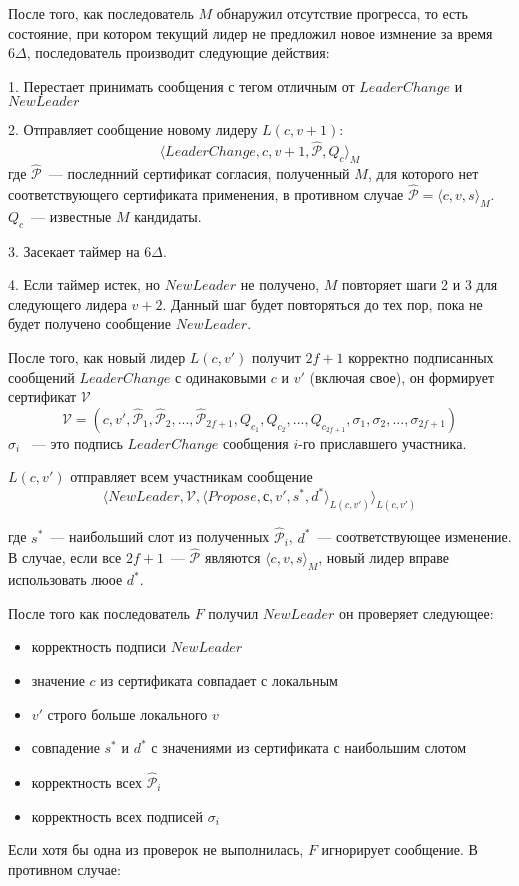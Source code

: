После того, как последователь $M$ обнаружил отсутствие прогресса, то есть состояние, при котором текущий лидер не предложил новое измнение за время $6\Delta$, последователь производит следующие действия:

1. Перестает принимать сообщения с тегом отличным от $LeaderChange$ и $NewLeader$

2. Отправляет сообщение новому лидеру $L(c, v+1)$:
\[ \langle LeaderChange, c, v+1,  \hat{\mathcal{P}}, Q_c \rangle_M \]
где $\hat{\mathcal{P}}$~--- последнний сертификат согласия, полученный $M$, для которого нет соответствующего сертификата применения, в противном случае $\hat{\mathcal{P}}=\langle c, v, s \rangle_M$. $Q_c$~--- известные $M$ кандидаты.

3. Засекает таймер на $6\Delta$.

4. Если таймер истек, но $NewLeader$ не получено, $M$ повторяет шаги 2 и 3 для следующего лидера $v+2$. Данный шаг будет повторяться до тех пор, пока не будет получено сообщение $NewLeader$.
\vspace{10pt}

После того, как новый лидер $L(c, v')$ получит $2f+1$ корректно подписанных сообщений $LeaderChange$ с одинаковыми $c$ и $v'$  (включая свое), он формирует сертификат $\mathcal{V}$
$$\mathcal{V}=(c, v', \hat{\mathcal{P}}_1, \hat{\mathcal{P}}_2,...,\hat{\mathcal{P}}_{2f+1}, Q_{c_1}, Q_{c_2},...,Q_{c_{2f+1}}, \sigma_1, \sigma_2,..., \sigma_{2f+1})$$ 
$\sigma_i$ ~--- это подпись $LeaderChange$ сообщения $i$-го приславшего участника.

$L(c, v')$ отправляет всем участникам сообщение
\[ \langle NewLeader, \mathcal{V}, \langle Propose, с, v', s^{*}, d^{*} \rangle_{L(c, v')} \rangle_{L(c, v')} \]

где $s^{*}$~--- наибольший слот из полученных $\hat{\mathcal{P}}_i$, $d^{*}$~--- соответствующее изменение. В случае, если все $2f+1$~--- $\hat{\mathcal{P}}$ являются $\langle c, v, s \rangle_M$, новый лидер вправе использовать люое $d^{*}$.
\vspace{10pt}

После того как последователь $F$ получил $NewLeader$ он проверяет следующее:
\begin{itemize}
\item корректность подписи $NewLeader$
\item значение $c$ из сертификата совпадает с локальным
\item $v'$ строго больше локального $v$
\item совпадение $s^{*}$ и $d^{*}$ с значениями из сертификата с наибольшим слотом
\item корректность всех $\hat{\mathcal{P}}_i$
\item корректность всех подписей $\sigma_i$
\end{itemize}
Если хотя бы одна из проверок не выполнилась, $F$ игнорирует сообщение. В противном случае:

